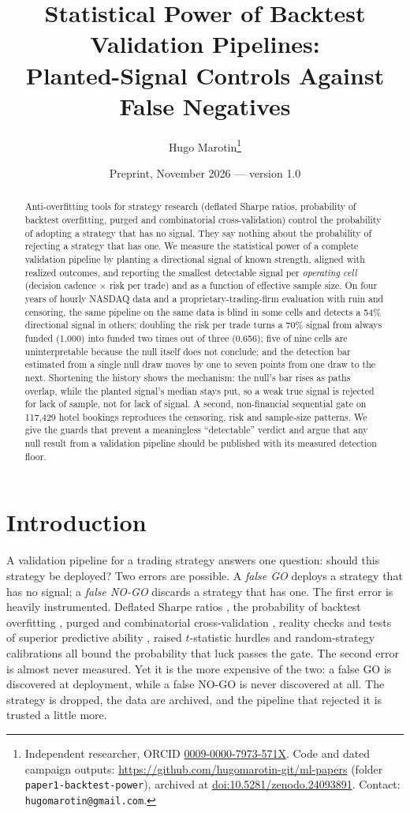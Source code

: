 \documentclass[11pt]{article}
\title{Statistical Power of Backtest Validation Pipelines:\\Planted-Signal Controls Against False Negatives}
\author{Hugo Marotin\thanks{Independent researcher, ORCID \href{https://orcid.org/0009-0000-7973-571X}{0009-0000-7973-571X}. Code and dated campaign outputs: \url{https://github.com/hugomarotin-git/ml-papers} (folder \texttt{paper1-backtest-power}), archived at \href{https://doi.org/10.5281/zenodo.24093891}{doi:10.5281/zenodo.24093891}. Contact: \texttt{hugomarotin@gmail.com}.}}
\date{Preprint, November 2026 --- version 1.0}
\begin{document}
\maketitle

\begin{abstract}
Anti-overfitting tools for strategy research (deflated Sharpe ratios, probability of backtest overfitting, purged and combinatorial cross-validation) control the probability of adopting a strategy that has no signal. They say nothing about the probability of rejecting a strategy that has one. We measure the statistical power of a complete validation pipeline by planting a directional signal of known strength, aligned with realized outcomes, and reporting the smallest detectable signal per \emph{operating cell} (decision cadence $\times$ risk per trade) and as a function of effective sample size. On four years of hourly NASDAQ data and a proprietary-trading-firm evaluation with ruin and censoring, the same pipeline on the same data is blind in some cells and detects a 54\% directional signal in others; doubling the risk per trade turns a 70\% signal from always funded (1.000) into funded two times out of three (0.656); five of nine cells are uninterpretable because the null itself does not conclude; and the detection bar estimated from a single null draw moves by one to seven points from one draw to the next. Shortening the history shows the mechanism: the null's bar rises as paths overlap, while the planted signal's median stays put, so a weak true signal is rejected for lack of sample, not for lack of signal. A second, non-financial sequential gate on 117,429 hotel bookings reproduces the censoring, risk and sample-size patterns. We give the guards that prevent a meaningless ``detectable'' verdict and argue that any null result from a validation pipeline should be published with its measured detection floor.
\end{abstract}

\section{Introduction}
\label{sec:intro}

A validation pipeline for a trading strategy answers one question: should this strategy be deployed? Two errors are possible. A \emph{false GO} deploys a strategy that has no signal; a \emph{false NO-GO} discards a strategy that has one. The first error is heavily instrumented. Deflated Sharpe ratios \citep{bailey2014a}, the probability of backtest overfitting \citep{bailey2016}, purged and combinatorial cross-validation \citep{lopezdeprado2018}, reality checks and tests of superior predictive ability \citep{white2000,hansen2005}, raised $t$-statistic hurdles \citep{harvey2016} and random-strategy calibrations \citep{chordia2020} all bound the probability that luck passes the gate. The second error is almost never measured. Yet it is the more expensive of the two: a false GO is discovered at deployment, while a false NO-GO is never discovered at all. The strategy is dropped, the data are archived, and the pipeline that rejected it is trusted a little more.
\end{document}
